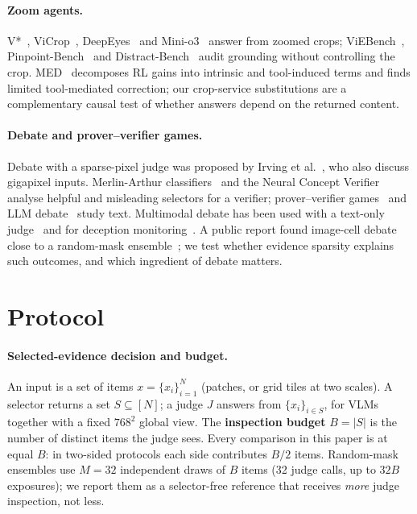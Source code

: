 \documentclass[10pt,twocolumn,letterpaper]{article}
\begin{document}
\paragraph{Zoom agents.} V*~\cite{wu2024vstar}, ViCrop~\cite{zhang2025vicrop}, DeepEyes~\cite{zheng2025deepeyes} and Mini-o3~\cite{minio3} answer from zoomed crops; ViEBench~\cite{viebench2026}, Pinpoint-Bench~\cite{pixeleyes2026} and Distract-Bench~\cite{distract2026} audit grounding without controlling the crop. MED~\cite{med2026} decomposes RL gains into intrinsic and tool-induced terms and finds limited tool-mediated correction; our crop-service substitutions are a complementary causal test of whether answers depend on the returned content.
\paragraph{Debate and prover--verifier games.} Debate with a sparse-pixel judge was proposed by Irving et al.~\cite{irving2018debate}, who also discuss gigapixel inputs. Merlin-Arthur classifiers~\cite{waldchen2024merlin} and the Neural Concept Verifier~\cite{ncv2026} analyse helpful and misleading selectors for a verifier; prover--verifier games~\cite{anil2021pvg,kirchner2024pvg,hammond2025nip} and LLM debate~\cite{khan2024debate,kenton2024scalable} study text. Multimodal debate has been used with a text-only judge~\cite{adhikari2025debating} and for deception monitoring~\cite{fang2026debateimages}. A public report found image-cell debate close to a random-mask ensemble~\cite{quantilized_debate}; we test whether evidence sparsity explains such outcomes, and which ingredient of debate matters.

\section{Protocol}\label{sec:protocol}
\paragraph{Selected-evidence decision and budget.} An input is a set of items $x=\{x_i\}_{i=1}^N$ (patches, or grid tiles at two scales). A selector returns a set $S\subseteq[N]$; a judge $J$ answers from $\{x_i\}_{i\in S}$, for VLMs together with a fixed $768^2$ global view. The \textbf{inspection budget} $B=|S|$ is the number of distinct items the judge sees. Every comparison in this paper is at equal $B$: in two-sided protocols each side contributes $B/2$ items. Random-mask ensembles use $M{=}32$ independent draws of $B$ items (32 judge calls, up to $32B$ exposures); we report them as a selector-free reference that receives \emph{more} judge inspection, not less.
\end{document}
